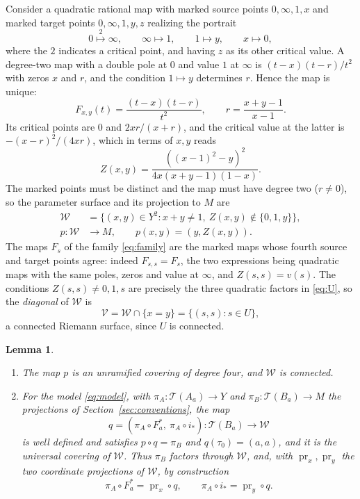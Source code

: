 \documentclass[12pt]{article}
\newcommand{\Teich}{\mathcal T}
\newcommand{\W}{\mathcal W}
\newcommand{\V}{\mathcal V}
\newcommand{\pr}{\operatorname{pr}}
\newtheorem{lemma}[theorem]{Lemma}
\theoremstyle{remark}
\numberwithin{equation}{section}
\begin{document}
Consider a quadratic rational map with marked source points $0,\infty,1,x$
and marked target points $0,\infty,1,y,z$ realizing the portrait
\begin{equation}\label{eq:portrait}
 0\stackrel{2}{\longmapsto}\infty,\qquad
 \infty\longmapsto1,\qquad 1\longmapsto y,\qquad
 x\longmapsto0,
\end{equation}
where the $2$ indicates a critical point, and having $z$ as its other
critical value. A degree-two map with a double pole at $0$ and value $1$ at
$\infty$ is $(t-x)(t-r)/t^2$ with zeros $x$ and $r$, and the condition
$1\mapsto y$ determines $r$. Hence the map is unique:
\begin{equation}\label{eq:Fxy}
 F_{x,y}(t)=\frac{(t-x)(t-r)}{t^2},
 \qquad r=\frac{x+y-1}{x-1}.
\end{equation}
Its critical points are $0$ and $2xr/(x+r)$, and the critical value at the
latter is $-(x-r)^2/(4xr)$, which in terms of $x,y$ reads
\begin{equation}\label{eq:Z}
 Z(x,y)=\frac{((x-1)^2-y)^2}{4x(x+y-1)(1-x)} .
\end{equation}
The marked points must be distinct and the map must have degree two
($r\ne0$), so the parameter surface and its projection to $M$ are
\begin{align}
 \W&=\{(x,y)\in Y^2:x+y\ne1,\ Z(x,y)\notin\{0,1,y\}\},
 \label{eq:W}\\
 p\colon\W&\longrightarrow M,\qquad p(x,y)=(y,Z(x,y)).
 \label{eq:p}
\end{align}
The maps $F_s$ of the family \eqref{eq:family} are the marked maps whose
fourth source and target points agree: indeed $F_{s,s}=F_s$, the two
expressions being quadratic maps with the same poles, zeros and value at
$\infty$, and $Z(s,s)=v(s)$. The conditions $Z(s,s)\ne0,1,s$ are precisely
the three quadratic factors in \eqref{eq:U}, so the \emph{diagonal} of
$\W$ is
\begin{equation}\label{eq:V}
 \V=\W\cap\{x=y\}=\{(s,s):s\in U\},
\end{equation}
a connected Riemann surface, since $U$ is connected.

\begin{lemma}\label{lem:cover}
\begin{enumerate}
\item The map $p$ is an unramified covering of degree four, and $\W$ is
connected.
\item For the model \eqref{eq:model}, with $\pi_A\colon\Teich(A_a)\to Y$
and $\pi_B\colon\Teich(B_a)\to M$ the projections of
Section~\ref{sec:conventions}, the map
\[
 q=(\pi_A\circ F_a^*,\ \pi_A\circ i_*)\colon\Teich(B_a)\longrightarrow\W
\]
is well defined and satisfies $p\circ q=\pi_B$ and $q(\tau_0)=(a,a)$, and
it is the universal covering of $\W$. Thus $\pi_B$ factors through $\W$,
and, with $\pr_x,\pr_y$ the two coordinate projections of $\W$, by
construction
\begin{equation}\label{eq:liftmaps}
 \pi_A\circ F_a^*=\pr_x\circ q,\qquad
 \pi_A\circ i_*=\pr_y\circ q .
\end{equation}
\end{enumerate}
\end{lemma}
\end{document}
